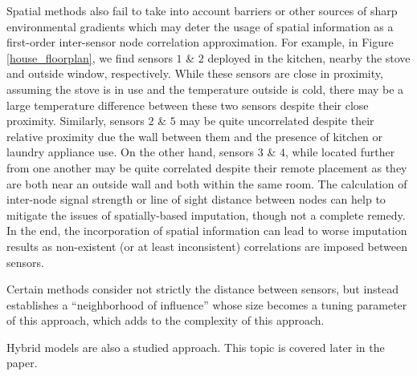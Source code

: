 Spatial methods also fail to take into account barriers or other sources of sharp environmental gradients which may deter the usage of spatial information as a first-order inter-sensor node correlation approximation.
For example, in Figure \ref{house_floorplan}, we find sensors $1$ \& $2$ deployed in the kitchen, nearby the stove and outside window, respectively. While these sensors are close in proximity, assuming the stove is in use and the temperature outside is cold, there may be a large temperature difference between these two sensors despite their close proximity.
Similarly, sensors $2$ \& $5$ may be quite uncorrelated despite their relative proximity due the wall between them and the presence of kitchen or laundry appliance use.
On the other hand, sensors $3$ \& $4$, while located further from one another may be quite correlated despite their remote placement as they are both near an outside wall and both within the same room.
The calculation of inter-node signal strength or line of sight distance between nodes can help to mitigate the issues of spatially-based imputation, though not a complete remedy.
In the end, the incorporation of spatial information can lead to worse imputation results as non-existent (or at least inconsistent) correlations are imposed between sensors.

Certain methods consider not strictly the distance between sensors, but instead establishes a ``neighborhood of influence'' whose size becomes a tuning parameter of this approach, which adds to the complexity of this approach.


Hybrid models are also a studied approach.
This topic is covered later in the paper. %

